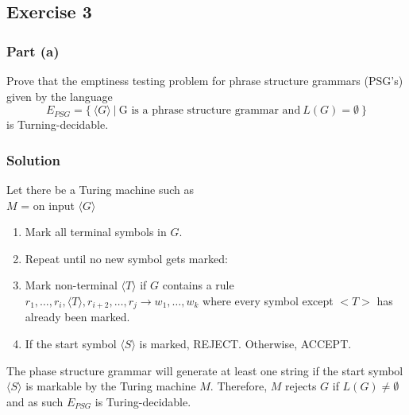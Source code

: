 \documentclass[12pt]{article}
\begin{document}
\subsection*{Exercise 3}

\subsubsection*{Part (a)}

Prove that the emptiness testing problem for phrase structure
grammars (PSG's) given by the language
\[ E_{PSG} = \{\ \langle G \rangle\ |\ \text{G is a phrase structure grammar and}\ L(G) = \emptyset\ \} \]
is Turning-decidable.

\subsubsection*{Solution}

Let there be a Turing machine such as\\
$M$ = on input $\langle G \rangle$
\begin{enumerate}
	\item Mark all terminal symbols in $G$.
	\item Repeat until no new symbol gets marked:
	\item Mark non-terminal $\langle T \rangle$ if $G$ contains a rule $r_1,\ldots,r_i,\langle T \rangle,r_{i+2},\ldots,r_j \rightarrow w_1,\ldots,w_k$ where every symbol except $<T>$ has already been marked.
	\item If the start symbol $\langle S \rangle$ is marked, REJECT. Otherwise, ACCEPT.
\end{enumerate}

The phase structure grammar will generate at least one string if the start symbol $\langle S \rangle$ is markable by the Turing machine $M$.
Therefore, $M$ rejects $G$ if $L(G) \ne \emptyset$ and as such $E_{PSG}$ is Turing-decidable.
\end{document}

